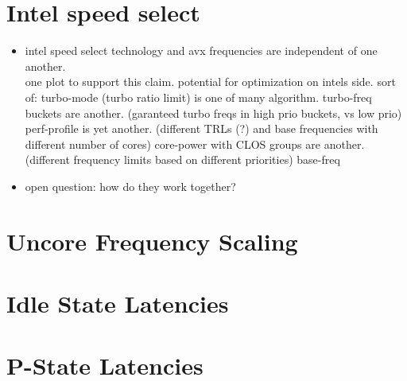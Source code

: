 

\section{Intel speed select}
\label{sec:isst}

\begin{itemize}
    \item intel speed select technology and avx frequencies are independent of one another.\\
    one plot to support this claim. potential for optimization on intels side.
    sort of: turbo-mode (turbo ratio limit) is one of many algorithm.
    turbo-freq buckets are another. (garanteed turbo freqs in high prio buckets, vs low prio)
    perf-profile is yet another. (different TRLs (?) and base frequencies with different number of cores)
    core-power with CLOS groups are another. (different frequency limits based on different priorities)
    base-freq
    \item open question: how do they work together?
\end{itemize}


\section{Uncore Frequency Scaling}

\section{Idle State Latencies}

\section{P-State Latencies}
